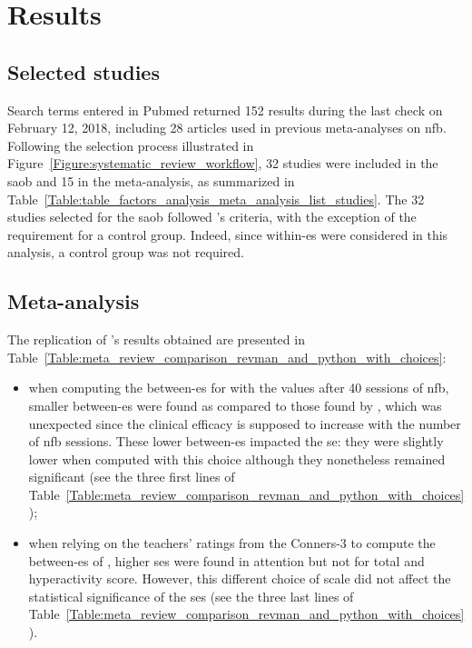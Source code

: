 


\section{Results}

\subsection{Selected studies}

Search terms entered in Pubmed returned 152 results during the last check on February 12, 2018, including 28 
articles used in previous meta-analyses on \gls{nfb}. Following the selection process illustrated 
in Figure~\ref{Figure:systematic_review_workflow}, 32 studies were included in the \gls{saob} and 15 in the meta-analysis, 
as summarized in Table~\ref{Table:table_factors_analysis_meta_analysis_list_studies}. The 32 studies selected for the \gls{saob} 
followed \citeauthor{Cortese2016}'s criteria, with the exception of the requirement for a control group. 
Indeed, since within-\gls{es} were considered in this analysis, a control group was not required.

\subsection{Meta-analysis}

The replication of \citeauthor{Cortese2016}'s results obtained are presented 
in Table~\ref{Table:meta_review_comparison_revman_and_python_with_choices}:

\begin{itemize}
    \item when computing the between-\gls{es} for \citet{Arnold2014} with the values after 40 sessions of \gls{nfb}, 
      smaller between-\gls{es} were found as compared to those found by \citet{Cortese2016}, which was unexpected since  
			the clinical efficacy is supposed to increase with the number of \gls{nfb} sessions. These lower between-\gls{es}
			impacted the \gls{se}: they were slightly lower when computed with this choice although they nonetheless remained significant (see the three first lines 
			of Table~\ref{Table:meta_review_comparison_revman_and_python_with_choices});  
    \item when relying on the teachers' ratings from the Conners-3 to compute the between-\gls{es} of \citet{Steiner2014}, 
		higher \glspl{se} were found in attention but not for total and hyperactivity score. However, this different choice of 
		scale did not affect the statistical significance of the \glspl{se} (see the three last lines 
			of Table~\ref{Table:meta_review_comparison_revman_and_python_with_choices}).
\end{itemize}

